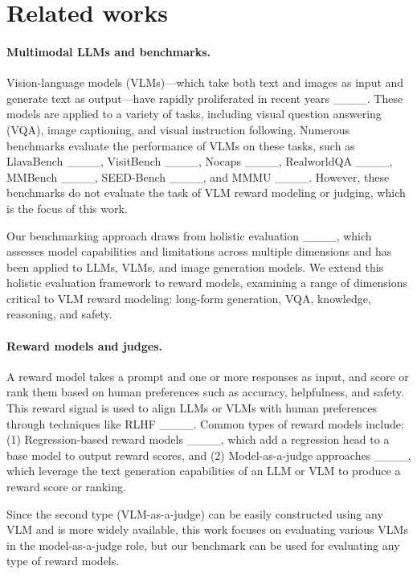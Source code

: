 \section{Related works}
\paragraph{Multimodal LLMs and benchmarks.}
Vision-language models (VLMs)---which take both text and images as input and generate text as output---have rapidly proliferated in recent years  ____. These models are applied to a variety of tasks, including visual question answering (VQA), image captioning, and visual instruction following.  
Numerous benchmarks evaluate the performance of VLMs on these tasks, such as LlavaBench ____, VisitBench ____, Nocaps ____, RealworldQA ____, MMBench ____, SEED-Bench ____, and MMMU ____. However, these benchmarks do not evaluate the task of VLM reward modeling or judging, which is the focus of this work.  

Our benchmarking approach draws from holistic evaluation ____, which assesses model capabilities and limitations across multiple dimensions and has been applied to LLMs, VLMs, and image generation models. We extend this holistic evaluation framework to reward models, examining a range of dimensions critical to VLM reward modeling: long-form generation, VQA, knowledge, reasoning, and safety.





\paragraph{Reward models and judges.}

A reward model takes a prompt and one or more responses as input, and score or rank them based on human preferences such as accuracy, helpfulness, and safety. This reward signal is used to align LLMs or VLMs with human preferences through techniques like RLHF ____.
Common types of reward models include:
(1) Regression-based reward models ____, which add a regression head to a base model to output reward scores, and
(2) Model-as-a-judge approaches ____, which leverage the text generation capabilities of an LLM or VLM to produce a reward score or ranking.

Since the second type (VLM-as-a-judge) can be easily constructed using any VLM and is more widely available, this work focuses on evaluating various VLMs in the model-as-a-judge role, but our benchmark can be used for evaluating any type of reward models.


